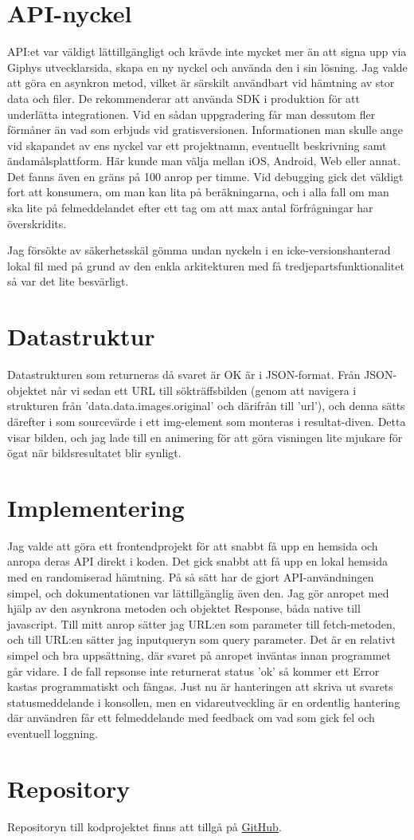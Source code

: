 \documentclass[12pt, letterpaper]{article}
\begin{document}
\section{API-nyckel}
API:et var väldigt lättillgängligt och krävde inte mycket mer än att signa upp via Giphys utvecklarsida, skapa en ny nyckel och använda den i sin lösning. Jag valde att göra en asynkron metod, vilket är särskilt användbart vid hämtning av stor data och filer. De rekommenderar att använda SDK i produktion för att underlätta integrationen. Vid en sådan uppgradering får man dessutom fler förmåner än vad som erbjuds vid gratisversionen. Informationen man skulle ange vid skapandet av ens nyckel var ett projektnamn, eventuellt beskrivning samt ändamålsplattform. Här kunde man välja mellan iOS, Android, Web eller annat. Det fanns även en gräns på 100 anrop per timme. Vid debugging gick det väldigt fort att konsumera, om man kan lita på beräkningarna, och i alla fall om man ska lite på felmeddelandet efter ett tag om att max antal förfrågningar har överskridits.

Jag försökte av säkerhetsskäl gömma undan nyckeln i en icke-versionshanterad lokal fil med på grund av den enkla arkitekturen med få tredjepartsfunktionalitet så var det lite besvärligt.

\section{Datastruktur}
Datastrukturen som returneras då svaret är OK är i JSON-format. Från JSON-objektet når vi sedan ett URL till sökträffsbilden (genom att navigera i strukturen från 'data.data.images.original' och därifrån till 'url'), och denna sätts därefter i som sourcevärde i ett img-element som monteras i resultat-diven. Detta visar bilden, och jag lade till en animering för att göra visningen lite mjukare för ögat när bildsresultatet blir synligt.  

\section{Implementering}
Jag valde att göra ett frontendprojekt för att snabbt få upp en hemsida och anropa deras API direkt i koden. Det gick snabbt att få upp en lokal hemsida med en randomiserad hämtning. På så sätt har de gjort API-användningen simpel, och dokumentationen var lättillgänglig även den. Jag gör anropet med hjälp av den asynkrona metoden och objektet Response, båda native till javascript. Till mitt anrop sätter jag URL:en som parameter till fetch-metoden, och till URL:en sätter jag inputqueryn som query parameter. Det är en relativt simpel och bra uppsättning, där svaret på anropet inväntas innan programmet går vidare. I de fall repsonse inte returnerat status 'ok' så kommer ett Error kastas programmatiskt och fångas. Just nu är hanteringen att skriva ut svarets statusmeddelande i konsollen, men en vidareutveckling är en ordentlig hantering där användren får ett felmeddelande med feedback om vad som gick fel och eventuell loggning. 

\section{Repository}
Repositoryn till kodprojektet finns att tillgå på \href{https://github.com/mariellelilja/hb-api}{GitHub}.
\end{document}
